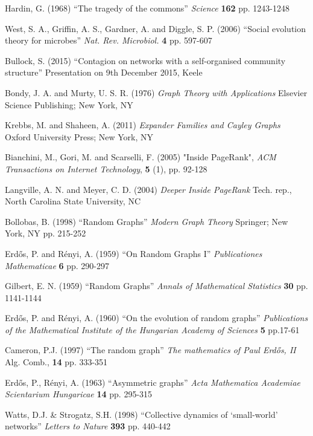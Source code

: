 \documentclass[a4paper, 12pt, notitlepage]{report}
\numberwithin{equation}{subsection}
\theoremstyle{definition}
\theoremstyle{theorem}
\theoremstyle{definition}
\begin{document}
\begin{thebibliography}{9}
Hardin, G. (1968) ``The tragedy of the commons'' \emph{Science} \textbf{162} pp. 1243-1248

West, S. A., Griffin, A. S., Gardner, A. and Diggle, S. P. (2006) ``Social evolution theory for microbes'' \emph{Nat. Rev. Microbiol.} \textbf{4} pp. 597-607

Bullock, S. (2015) ``Contagion on networks with a self-organised community structure'' Presentation on 9th December 2015, Keele

Bondy, J. A. and Murty, U. S. R. (1976) \emph{Graph Theory with Applications} Elsevier Science Publishing; New York, NY

Krebbs, M. and Shaheen, A. (2011) \emph{Expander Families and Cayley Graphs} Oxford University Press; New York, NY

Bianchini, M., Gori, M. and Scarselli, F. (2005) "Inside PageRank", \emph{ACM Transactions on Internet Technology}, \textbf{5} (1), pp. 92-128

Langville, A. N. and Meyer, C. D. (2004) \emph{Deeper Inside PageRank} Tech. rep., North Carolina State University, NC

Bollobas, B. (1998) ``Random Graphs'' \emph{Modern Graph Theory} Springer; New York, NY pp. 215-252

Erd\H{o}s, P. and R\'{e}nyi, A. (1959) ``On Random Graphs I'' \emph{Publicationes Mathematicae} \textbf{6} pp. 290-297

Gilbert, E. N. (1959) ``Random Graphs'' \emph{Annals of Mathematical Statistics} \textbf{30} pp. 1141-1144

Erd\H{o}s, P. and R\'{e}nyi, A. (1960) ``On the evolution of random graphs'' \emph{Publications of the Mathematical Institute of the Hungarian Academy of Sciences} \textbf{5} pp.17-61

Cameron, P.J. (1997) ``The random graph'' \emph{The mathematics of Paul Erd\H{o}s, II} Alg. Comb., \textbf{14} pp. 333-351

Erd\H{o}s, P., R\'{e}nyi, A. (1963) ``Asymmetric graphs'' \emph{Acta Mathematica Academiae Scientarium Hungaricae} \textbf{14} pp. 295-315

Watts, D.J. \& Strogatz, S.H. (1998) ``Collective dynamics of `small-world' networks'' \emph{Letters to Nature} \textbf{393} pp. 440-442


\end{thebibliography}
\end{document}
